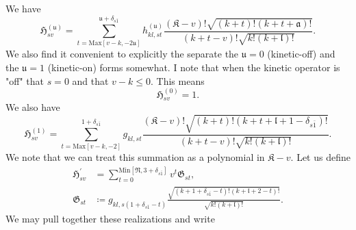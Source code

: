 We have
\begin{equation}
\mathfrak{H}_{sv}^{\left(\mathfrak{u}\right)}
    =
        \sum
        _{t=\text{Max}\left[v-k,-2\mathfrak{u}\right]}
        ^{\mathfrak{u}+\delta_{s\bar{1}}}
        h^{\left(\mathfrak{u}\right)}_{kl,st}
        \frac
        {
            \left(\mathfrak{K}-v\right)!
            \sqrt{\left(k+t\right)!\left(k+t+\mathfrak{a}\right)!}
        }
        {\left(k+t-v\right)!\sqrt{k!\left(k+\mathfrak{l}\right)!}}
.
\end{equation}
We also find it convenient to explicitly the separate the $\mathfrak{u} = 0$
(kinetic-off) and the $\mathfrak{u} = 1$ (kinetic-on) forms somewhat. I note
that when the kinetic operator is "off" that $s = 0$ and that $v-k\le 0$. This
means
\begin{equation}
\mathfrak{H}_{sv}^{\left(0\right)} = 1
.
\end{equation}
We also have
\begin{equation}
    \mathfrak{H}_{sv}^{\left(1\right)}
        =
            \sum_{t=\text{Max}\left[v-k,-2\right]}^{1+\delta_{s\bar{1}}}
            g_{kl,st}
            \frac
            {
                \left(\mathfrak{K}-v\right)!
                \sqrt{
                    \left(k+t\right)!
                    \left(k+t+\mathfrak{l}+1-\delta_{s\bar{1}}\right)!
                }
            }
            {\left(k+t-v\right)!\sqrt{k!\left(k+\mathfrak{l}\right)!}}
.
\end{equation}
We note that we can treat this summation as a polynomial in $\mathfrak{K}-v$.
Let us define
\begin{align}
\mathfrak{H}^{\prime}_{sv}
    &=
        \sum
        _{t=0}
        ^{\text{Min}\left[\mathfrak{N},3+\delta_{s\bar{1}}\right]}
        v^{t}
        \mathfrak{G}_{st}
,\\
\mathfrak{G}_{st}
    &\coloneqq
        g_{kl,s\left(1+\delta_{s\bar{1}}-t\right)}
        \frac
        {
            \sqrt{
                \left(k+1+\delta_{s\bar{1}}-t\right)!
                \left(k+\mathfrak{l}+2-t\right)!
            }
        }
        {
            \sqrt{k!\left(k+\mathfrak{l}\right)!}
        }
.
\end{align}
We may pull together these realizations and write
